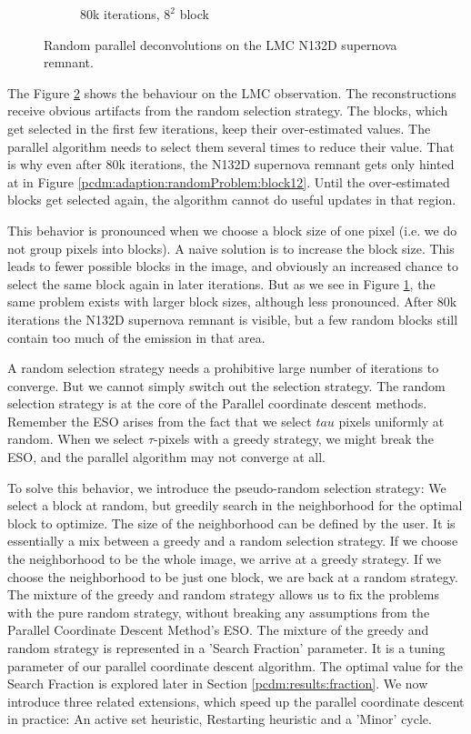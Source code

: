 \begin{figure}[h]
\begin{subfigure}[b]{0.2405\linewidth}
		\caption{80k iterations, $8^2$ block}
		\label{pcdm:adaption:randomProblem:block82}
	\end{subfigure}
	\caption{Random parallel deconvolutions on the LMC N132D supernova remnant.}
	\label{pcdm:adaption:randomProblem}
\end{figure}

The Figure \ref{pcdm:adaption:randomProblem} shows the behaviour on the LMC observation. The reconstructions receive obvious artifacts from the random selection strategy. The blocks, which get selected in the first few iterations, keep their over-estimated values. The parallel algorithm needs to select them several times to reduce their value. That is why even after 80k iterations, the N132D supernova remnant gets only hinted at in Figure \ref{pcdm:adaption:randomProblem:block12}. Until the over-estimated blocks get selected again, the algorithm cannot do useful updates in that region.

This behavior is pronounced when we choose a block size of one pixel (i.e. we do not group pixels into blocks). A naive solution is to increase the block size. This leads to fewer possible blocks in the image, and obviously an increased chance to select the same block again in later iterations. But as we see in Figure \ref{pcdm:adaption:randomProblem:block82}, the same problem exists with larger block sizes, although less pronounced. After 80k iterations the N132D supernova remnant is visible, but a few random blocks still contain too much of the emission in that area.

A random selection strategy needs a prohibitive large number of iterations to converge. But we cannot simply switch out the selection strategy. The random selection strategy is at the core of the Parallel coordinate descent methods. Remember the ESO arises from the fact that we select $tau$ pixels uniformly at random. When we select $\tau$-pixels with a greedy strategy, we might break the ESO, and the parallel algorithm may not converge at all.

To solve this behavior, we introduce the pseudo-random selection strategy:  We select a block at random, but greedily search in the neighborhood for the optimal block to optimize. The size of the neighborhood can be defined by the user. It is essentially a mix between a greedy and a random selection strategy. If we choose the neighborhood to be the whole image, we arrive at a greedy strategy. If we choose the neighborhood to be just one block, we are back at a random strategy. The mixture of the greedy and random strategy allows us to fix the problems with the pure random strategy, without breaking any assumptions from the Parallel Coordinate Descent Method's ESO. The mixture of the greedy and random strategy is represented in a 'Search Fraction' parameter. It is a tuning parameter of our parallel coordinate descent algorithm. The optimal value for the Search Fraction is explored later in Section \ref{pcdm:results:fraction}. We now introduce three related extensions, which speed up the  parallel coordinate descent in practice: An active set heuristic, Restarting heuristic and a 'Minor' cycle.




